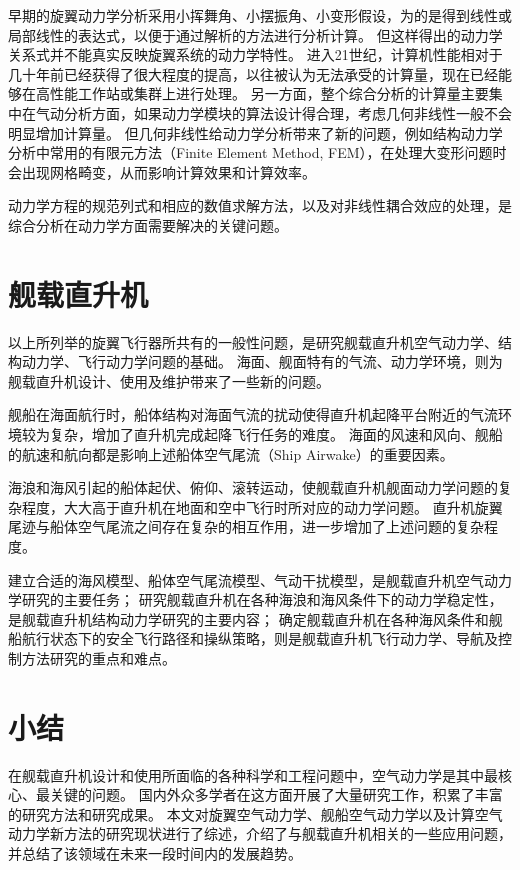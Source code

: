 \documentclass[doctor,openright,twoside,color]{buaathesis}
\begin{document}
早期的旋翼动力学分析采用小挥舞角、小摆振角、小变形假设，为的是得到线性或局部线性的表达式，以便于通过解析的方法进行分析计算。
但这样得出的动力学关系式并不能真实反映旋翼系统的动力学特性。
进入21世纪，计算机性能相对于几十年前已经获得了很大程度的提高，以往被认为无法承受的计算量，现在已经能够在高性能工作站或集群上进行处理。
另一方面，整个综合分析的计算量主要集中在气动分析方面，如果动力学模块的算法设计得合理，考虑几何非线性一般不会明显增加计算量。
但几何非线性给动力学分析带来了新的问题，例如结构动力学分析中常用的有限元方法（Finite Element Method, FEM），在处理大变形问题时会出现网格畸变，从而影响计算效果和计算效率。

动力学方程的规范列式和相应的数值求解方法，以及对非线性耦合效应的处理，是综合分析在动力学方面需要解决的关键问题。

\section{舰载直升机}
以上所列举的旋翼飞行器所共有的一般性问题，是研究舰载直升机空气动力学、结构动力学、飞行动力学问题的基础。
海面、舰面特有的气流、动力学环境，则为舰载直升机设计、使用及维护带来了一些新的问题。

舰船在海面航行时，船体结构对海面气流的扰动使得直升机起降平台附近的气流环境较为复杂，增加了直升机完成起降飞行任务的难度。
海面的风速和风向、舰船的航速和航向都是影响上述船体空气尾流（Ship Airwake）的重要因素。

海浪和海风引起的船体起伏、俯仰、滚转运动，使舰载直升机舰面动力学问题的复杂程度，大大高于直升机在地面和空中飞行时所对应的动力学问题。
直升机旋翼尾迹与船体空气尾流之间存在复杂的相互作用，进一步增加了上述问题的复杂程度。

建立合适的海风模型、船体空气尾流模型、气动干扰模型，是舰载直升机空气动力学研究的主要任务；
研究舰载直升机在各种海浪和海风条件下的动力学稳定性，是舰载直升机结构动力学研究的主要内容；
确定舰载直升机在各种海风条件和舰船航行状态下的安全飞行路径和操纵策略，则是舰载直升机飞行动力学、导航及控制方法研究的重点和难点。

\section{小结}

在舰载直升机设计和使用所面临的各种科学和工程问题中，空气动力学是其中最核心、最关键的问题。
国内外众多学者在这方面开展了大量研究工作，积累了丰富的研究方法和研究成果。
本文对旋翼空气动力学、舰船空气动力学以及计算空气动力学新方法的研究现状进行了综述，介绍了与舰载直升机相关的一些应用问题，并总结了该领域在未来一段时间内的发展趋势。
\end{document}
